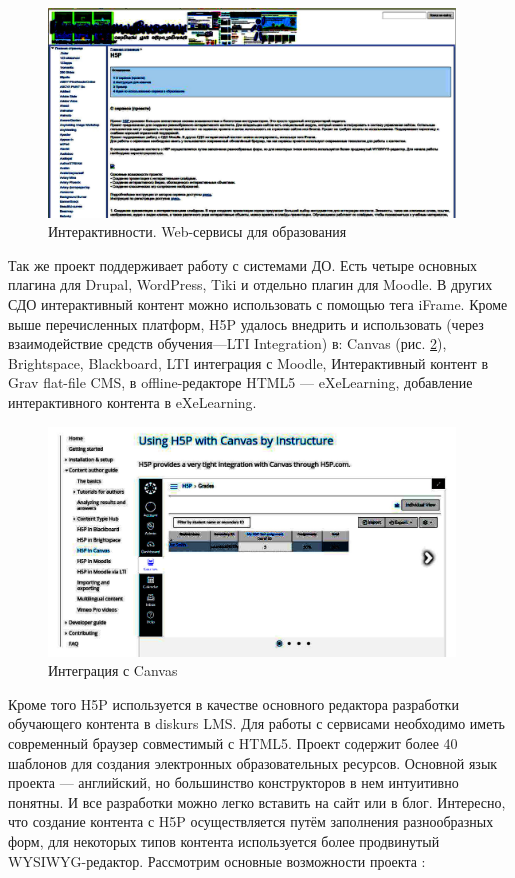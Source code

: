 \documentclass[10pt, a5paper]{article}
\begin{document}
\begin{center}
\begin{figure}[h!]
  \centering
  \includegraphics[width=10.8cm]{16_clip03}
  \caption{Интерактивности. Web-сервисы для образования}
  \label{clip:fig3}
\end{figure}
\end{center}

Так же проект поддерживает работу с системами ДО. Есть четыре основных плагина для Drupal, WordPress, Tiki и отдельно плагин для Moodle. В других СДО интерактивный контент можно использовать с помощью тега iFrame. Кроме выше перечисленных платформ, H5P удалось внедрить и использовать (через взаимодействие средств обучения—LTI Integration) в: Canvas (рис. \ref{clip:fig4}), Brightspace, Blackboard, LTI интеграция с Moodle, Интерактивный контент в Grav flat-file CMS,
в offline-редакторе HTML5 — \linebreak eXeLearning, добавление интерактивного контента в eXeLearning.


\begin{center}
\begin{figure}[h!]
  \centering
  \includegraphics[width=10.8cm]{16_clip04}
  \caption{Интеграция с Canvas}
  \label{clip:fig4}
\end{figure}
\end{center} 

Кроме того H5P используется в качестве основного редактора разработки обучающего контента в diskurs LMS.
Для работы с сервисами необходимо иметь современный браузер совместимый с HTML5. Проект содержит более 40 шаблонов для создания электронных образовательных ресурсов. Основной язык проекта — английский, но большинство конструкторов в нем интуитивно понятны. И все разработки можно легко вставить на сайт или в блог. Интересно, что создание контента с H5P осуществляется путём заполнения разнообразных форм, для некоторых типов контента используется более продвинутый WYSIWYG-редактор. Рассмотрим основные возможности проекта \cite{bib5}:
\end{document}
